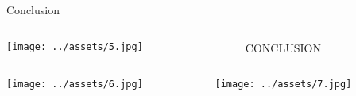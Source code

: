 \documentclass{beamer}
\begin{document}
\begin{frame}{Conclusion}
\begin{columns}
    \begin{column}{.5\linewidth}
        \texttt{[image: ../assets/5.jpg]}
    \end{column}
    \begin{column}{.5\linewidth}
        \begin{itemize}
            CONCLUSION
        \end{itemize}
    \end{column}
\end{columns}
\end{frame}

\begin{frame}{}
\begin{columns}
    \begin{column}{.5\linewidth}
        \texttt{[image: ../assets/6.jpg]}
    \end{column}
    \begin{column}{.5\linewidth}
        \texttt{[image: ../assets/7.jpg]}
    \end{column}
\end{columns}
\end{frame}
\end{document}
